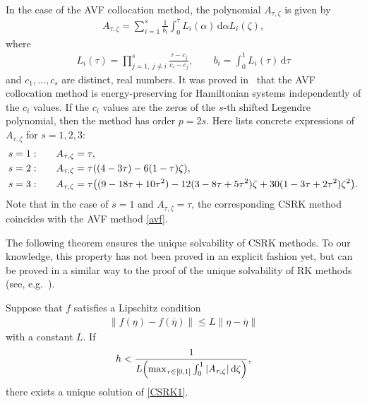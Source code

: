 \documentclass[final,leqno,onefignum,onetabnum]{siamltex1213}
\DeclarePairedDelimiter\paren{\lparen}{\rparen}
\begin{document}
In the case of the AVF collocation method,
the polynomial $A_{\tau,\zeta}$ is given by
\begin{align}
A_{\tau,\zeta} = \sum_{i=1}^s \frac{1}{b_i} \int_0^\tau L_i(\alpha)\,{\mathrm d} \alpha
L_i(\zeta),
\end{align}
where
\begin{align}
L_i (\tau) = \prod_{j=1,\ j\neq i}^s \frac{\tau-c_j}{c_i-c_j}, \qquad
b_i = \int_0^1 L_i (\tau) \,{\mathrm d} \tau
\end{align}
and $c_1,\dots,c_s$ are distinct, real numbers.
It was proved in~\cite{ha10} that the AVF collocation method is energy-preserving
for Hamiltonian systems
independently of the $c_i$ values.
If the $c_i$ values are the zeros of the $s$-th shifted Legendre polynomial,
then the method has order $p=2s$.
Here lists concrete expressions of $A_{\tau,\zeta}$ for $s=1,2,3$:
\begin{alignat}{2}
s=1: &\qquad A_{\tau,\zeta}= \tau, \\
s=2: &\qquad  A_{\tau,\zeta} = \tau \paren*{(4-3\tau)-6(1-\tau)\zeta}, \\
s=3: &\qquad  A_{\tau,\zeta} =
\tau \paren*{(9-18\tau +10\tau^2) - 12(3-8\tau+5\tau^2)\zeta 
+ 30(1-3\tau+2\tau^2)\zeta^2 }.
\end{alignat}
Note that in the case of $s=1$ and $A_{\tau,\zeta}=\tau$,
the corresponding CSRK method coincides with the AVF method \eqref{avf}.

The following theorem ensures the unique solvability of CSRK methods.
To our knowledge, this property has not been proved in an explicit fashion yet,
but can be proved in a similar way to the proof of the unique solvability of RK methods
(see, e.g.~\cite{bu08,hw96}).

\begin{theorem}
Suppose that $f$ satisfies a Lipschitz condition
\begin{align*}
\| f(\eta) - f(\overline{\eta}) \| \leq L\| \eta - \overline{\eta}\|
\end{align*}
with a constant $L$.
If 
\begin{align*}
h < \frac{1}{L\paren*{\max_{\tau\in [0,1]}\int_0^1|A_{\tau,\zeta}|\,{\mathrm d}\zeta} } ,
\end{align*}
there exists a unique solution of \eqref{CSRK1}.
\end{theorem}
\end{document}
